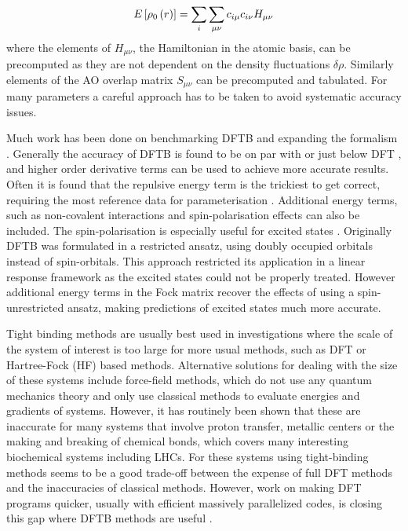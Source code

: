 \begin{equation}
    E_{} \left[ \rho_0\left(r\right) \right] = \sum_i \sum_{\mu\nu} c_{i\mu}c_{i\nu} H_{\mu\nu}
\end{equation}
%
where the elements of $H_{\mu\nu}$, the Hamiltonian in the atomic basis, can be 
precomputed as they are not dependent on the density fluctuations $\delta \rho$. 
Similarly elements of the AO overlap matrix $S_{\mu\nu}$ can be precomputed and 
tabulated. For many parameters a careful approach has to be taken to avoid systematic 
accuracy issues.

Much work has been done on benchmarking DFTB and expanding the formalism \cite{Koskinen2009, Goldman2012, AndreaRozzi2004, Kohler2005, Niehaus2005, Han2000}. 
Generally the accuracy of DFTB is found to be on par with or just below DFT \cite{Lutsker2015, Gruden2017, Vuong2018},
and higher order derivative terms can be used to achieve more accurate results. 
Often it is found that the repulsive energy term is the trickiest to get correct, 
requiring the most reference data for parameterisation \cite{Koskinen2009}. Additional 
energy terms, such as non-covalent interactions and spin-polarisation effects can 
also be included. The spin-polarisation is especially useful for excited states \cite{Melix2016}. 
Originally DFTB was formulated in a restricted ansatz, using doubly occupied orbitals 
instead of spin-orbitals. This approach restricted its application in a linear response
framework as the excited states could not be properly treated. However additional 
energy terms in the Fock matrix recover the effects of using a spin-unrestricted 
ansatz, making predictions of excited states much more accurate.

Tight binding methods are usually best used in investigations where the scale of 
the  system of interest is too large for more usual methods, such as DFT or Hartree-Fock 
(HF) based methods. Alternative solutions for dealing with the size of these systems 
include force-field methods, which do not use any quantum mechanics theory and only
use classical methods to evaluate energies and gradients of systems. However, it
has routinely been shown that these are inaccurate for many systems that involve 
proton transfer, metallic centers or the making and breaking of chemical bonds\cite{Salomon-Ferrer2013},
which covers many interesting biochemical systems including LHCs. For these systems
using tight-binding methods seems to be a good trade-off between the expense of 
full DFT methods and the inaccuracies of classical methods. However, work on making 
DFT programs quicker, usually with efficient massively parallelized codes, is closing 
this gap where DFTB methods are useful \cite{Manathunga2020}.

